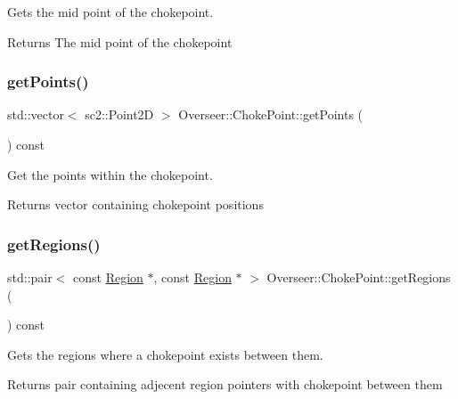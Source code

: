 Gets the mid point of the chokepoint. 

\begin{DoxyReturn}{Returns}
The mid point of the chokepoint 
\end{DoxyReturn}
\mbox{\label{classOverseer_1_1ChokePoint_a753c9b428f2f0b7d3d0917824b1c644c}} 
\subsubsection{\texorpdfstring{get\+Points()}{getPoints()}}
{\footnotesize\ttfamily std\+::vector$<$ sc2\+::\+Point2D $>$ Overseer\+::\+Choke\+Point\+::get\+Points (\begin{DoxyParamCaption}{ }\end{DoxyParamCaption}) const}



Get the points within the chokepoint. 

\begin{DoxyReturn}{Returns}
vector containing chokepoint positions 
\end{DoxyReturn}
\mbox{\label{classOverseer_1_1ChokePoint_a205129078ae22b4ee04d4a0f74348acc}} 
\subsubsection{\texorpdfstring{get\+Regions()}{getRegions()}}
{\footnotesize\ttfamily std\+::pair$<$ const \hyperlink{classOverseer_1_1Region}{Region} $\ast$, const \hyperlink{classOverseer_1_1Region}{Region} $\ast$ $>$ Overseer\+::\+Choke\+Point\+::get\+Regions (\begin{DoxyParamCaption}{ }\end{DoxyParamCaption}) const}



Gets the regions where a chokepoint exists between them. 

\begin{DoxyReturn}{Returns}
pair containing adjecent region pointers with chokepoint between them 
\end{DoxyReturn}
\mbox{\label{classOverseer_1_1ChokePoint_a5b80f5db4c702537d5298e473442054d}} 
